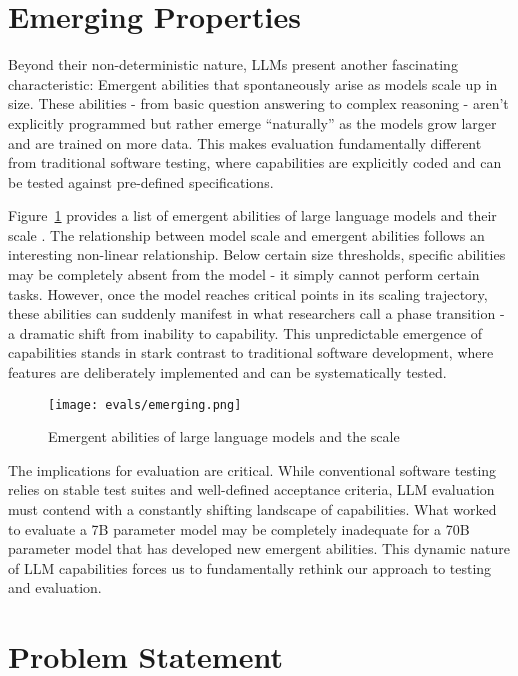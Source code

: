 \section{Emerging Properties}

Beyond their non-deterministic nature, LLMs present another fascinating characteristic: Emergent abilities that spontaneously arise as models scale up in size. These abilities - from basic question answering to complex reasoning - aren't explicitly programmed but rather emerge ``naturally'' as the models grow larger and are trained on more data. This makes evaluation fundamentally different from traditional software testing, where capabilities are explicitly coded and can be tested against pre-defined specifications.

Figure~\ref{fig:emerging-properties} provides a list of emergent abilities of large language models and their scale . The relationship between model scale and emergent abilities follows an interesting non-linear relationship. Below certain size thresholds, specific abilities may be completely absent from the model - it simply cannot perform certain tasks. However, once the model reaches critical points in its scaling trajectory, these abilities can suddenly manifest in what researchers call a phase transition - a dramatic shift from inability to capability. This unpredictable emergence of capabilities stands in stark contrast to traditional software development, where features are deliberately implemented and can be systematically tested.

\begin{figure}
\centering
\texttt{[image: evals/emerging.png]}
\caption{Emergent abilities of large language models and the scale \cite{wei2022emergentabilitieslargelanguage}}
\label{fig:emerging-properties}
\end{figure}

The implications for evaluation are critical. While conventional software testing relies on stable test suites and well-defined acceptance criteria, LLM evaluation must contend with a constantly shifting landscape of capabilities. What worked to evaluate a 7B parameter model may be completely inadequate for a 70B parameter model that has developed new emergent abilities. This dynamic nature of LLM capabilities forces us to fundamentally rethink our approach to testing and evaluation.

\section{Problem Statement}

